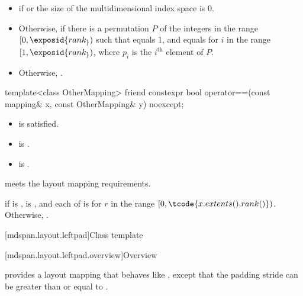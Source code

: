 \begin{itemdescr}
\pnum
\returns
\begin{itemize}
\item
{} if  or the size of the multidimensional index space
 is 0.
\item
Otherwise,  if there is
a permutation $P$ of the integers in the range $[0, \exposid{rank_})$
such that  equals 1, and
 equals 
for $i$ in the range $[1, \exposid{rank_})$,
where $p_i$ is the $i^\text{th}$ element of $P$.
\item
Otherwise, .
\end{itemize}
\end{itemdescr}

%
\begin{itemdecl}
template<class OtherMapping>
  friend constexpr bool operator==(const mapping& x, const OtherMapping& y) noexcept;
\end{itemdecl}

\begin{itemdescr}
\pnum
\constraints
\begin{itemize}
\item
{} is satisfied.
\item
{} is .
\item
{} is .
\end{itemize}

\pnum
\expects
{} meets the layout mapping requirements.

\pnum
\returns
{} if  is ,
 is , and
each of  is 
for $r$ in the range  $[0, \tcode{x.extents().rank()})$.
Otherwise, .
\end{itemdescr}

[mdspan.layout.leftpad]{Class template }

[mdspan.layout.leftpad.overview]{Overview}

\pnum
{} provides a layout mapping
that behaves like ,
except that the padding stride 
can be greater than or equal to .

